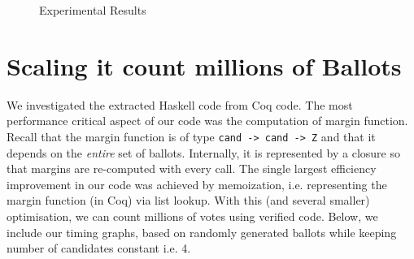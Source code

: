 \begin{figure}
\centering     %
{}
\caption{Experimental Results}
\label{fig:test}
\end{figure}

%
  
 \section{Scaling it count millions of Ballots}
 \label{sec:count_million}
 We investigated the extracted Haskell code  from Coq code.
The most performance critical aspect of our code was the computation of  margin
function. Recall that the margin function is of type
\texttt{cand -> cand -> Z}
and that it depends on the \emph{entire} set of ballots. Internally, it is
represented by a closure \cite{Landin:1964:MEE} so that margins are
re-computed with every call. The single largest efficiency
improvement in our code was achieved by memoization, i.e.
representing the margin function (in Coq) via list lookup. With
this (and several smaller) optimisation, we can count millions of
votes using verified code. Below, we include our timing graphs,
based on randomly generated ballots while keeping number of candidates
constant i.e. 4. 


